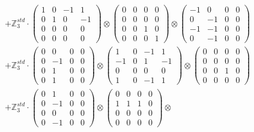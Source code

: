 \documentclass{article}
\begin{document}
{\begin{align}
        &+ \label{Rs1-Rc16-Solution-4-c12} \mathbb{Z}_3^{std} \cdot 
            \begin{pmatrix} 1 & 0 & -1 & 1 \\ 0 & 1 & 0 & -1 \\ 0 & 0 & 0 & 0 \\ 0 & 0 & 0 & 0 \end{pmatrix} \otimes 
            \begin{pmatrix} 0 & 0 & 0 & 0 \\ 0 & 0 & 0 & 0 \\ 0 & 0 & 1 & 0 \\ 0 & 0 & 0 & 1 \end{pmatrix} \otimes 
            \begin{pmatrix} -1 & 0 & 0 & 0 \\ 0 & -1 & 0 & 0 \\ -1 & -1 & 0 & 0 \\ 0 & -1 & 0 & 0 \end{pmatrix} \\ 
        &+ \label{Rs1-Rc16-Solution-4-c13} \mathbb{Z}_3^{std} \cdot 
            \begin{pmatrix} 0 & 0 & 0 & 0 \\ 0 & -1 & 0 & 0 \\ 0 & 1 & 0 & 0 \\ 0 & 1 & 0 & 0 \end{pmatrix} \otimes 
            \begin{pmatrix} 1 & 0 & -1 & 1 \\ -1 & 0 & 1 & -1 \\ 0 & 0 & 0 & 0 \\ 1 & 0 & -1 & 1 \end{pmatrix} \otimes 
            \begin{pmatrix} 0 & 0 & 0 & 0 \\ 0 & 0 & 0 & 0 \\ 0 & 0 & 1 & 0 \\ 0 & 0 & 0 & 0 \end{pmatrix} \\ 
        &+ \label{Rs1-Rc16-Solution-4-c14} \mathbb{Z}_3^{std} \cdot 
            \begin{pmatrix} 0 & 1 & 0 & 0 \\ 0 & -1 & 0 & 0 \\ 0 & 0 & 0 & 0 \\ 0 & -1 & 0 & 0 \end{pmatrix} \otimes 
            \begin{pmatrix} 0 & 0 & 0 & 0 \\ 1 & 1 & 1 & 0 \\ 0 & 0 & 0 & 0 \\ 0 & 0 & 0 & 0 \end{pmatrix} \otimes 

\end{align}}
\end{document}
